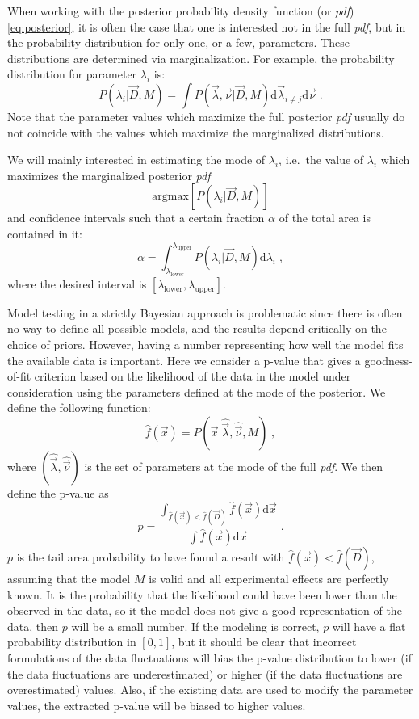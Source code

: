 When working with the posterior probability density function (or \emph{pdf}) \ref{eq:posterior}, it is often the case that one is interested not in the full \emph{pdf}, but in the probability distribution for only one, or a few, parameters. These distributions are determined via marginalization. For example, the probability distribution for parameter $\lambda_i$ is:
\[P(\lambda_i|\vec{D},M)=\int P(\vec{\lambda},\vec{\nu}|\vec{D},M)\text{d}\vec{\lambda}_{i\neq j}\text{d}\vec{\nu}\;.\]
Note that the parameter values which maximize the full posterior \emph{pdf} usually do not coincide with the values which maximize the marginalized distributions.

We will mainly interested in estimating the mode of $\lambda_i$, i.e.~the value of $\lambda_i$ which maximizes the marginalized posterior \emph{pdf}
\[\text{argmax}\left[ P(\lambda_i|\vec{D},M) \right]\]
and confidence intervals such that a certain fraction $\alpha$ of the total area is contained in it:
\[\alpha=\int^{\lambda_\text{upper}}_{\lambda_\text{lower}}P(\lambda_i|\vec{D},M)\text{d}\lambda_i\;,\]
where the desired interval is $[\lambda_\text{lower},\lambda_\text{upper}]$.

 Model testing in a strictly Bayesian approach is problematic since there is often no way to define all possible models, and the results depend critically on the choice of priors. However, having a number representing how well the model fits the available data is important. Here we consider a p-value that gives a goodness-of-fit criterion based on the likelihood of the data in the model under consideration using the parameters defined at the mode of the posterior. We define the following function:
\[\hat{f}(\vec{x})=P(\vec{x}|\hat{\vec{\lambda}},\hat{\vec{\nu}},M)\;,\]
where $(\hat{\vec{\lambda}},\hat{\vec{\nu}})$ is the set of parameters at the mode of the full \emph{pdf}. We then define the p-value as
\[p=\frac{\int_{\hat{f}(\vec{x})<\hat{f}(\vec{D})}\hat{f}(\vec{x})\text{d}\vec{x}}{\int \hat{f}(\vec{x})\text{d}\vec{x}}\;.\]
$p$ is the tail area probability to have found a result with $\hat{f}(\vec{x})<\hat{f}(\vec{D})$, assuming that the model $M$ is valid and all experimental effects are perfectly known. It is the probability that the likelihood could have been lower than the observed in the data, so it the model does not give a good representation of the data, then $p$ will be a small number. If the modeling is correct, $p$ will have a flat probability distribution in $[0,1]$, but it should be clear that incorrect formulations of the data fluctuations will bias the p-value distribution to lower (if the data fluctuations are underestimated) or higher (if the data fluctuations are overestimated) values. Also, if the existing data are used to modify the parameter values, the extracted p-value will be biased to higher values.

